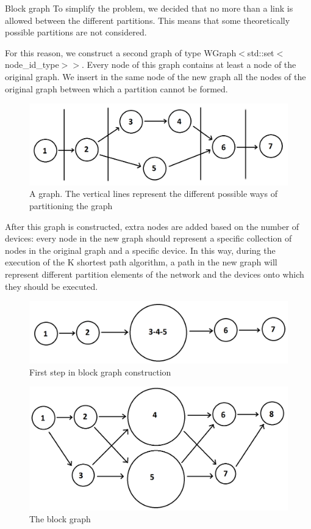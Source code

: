 \begin{frame}[allowframebreaks]{Block graph}
    To simplify the problem, we decided that no more than a link is allowed between the different partitions. This means that some theoretically possible partitions are not considered. 
    
    For this reason, we construct a second graph of type WGraph$<$std::set$<$node\_id\_type$>>$. Every node of this graph contains at least a node of the original graph. We insert in the same node of the new graph all the nodes of the original graph between which a partition cannot be formed.
    
        \begin{figure}[h]
        \centering
    \includegraphics[width=0.4\linewidth]{Img/butcher/basic_graph.png}
    \caption{A graph. The vertical lines represent the different possible ways of partitioning the graph}
    \end{figure}
    
    \framebreak
    
    After this graph is constructed, extra nodes are added based on the number of devices: every node in the new graph should represent a specific collection of nodes in the original graph and a specific device. In this way, during the execution of the K shortest path algorithm, a path in the new graph will represent different partition elements of the network and the devices onto which they should be executed.
    
    \framebreak
    
        \begin{figure}[h]
        \centering
    \includegraphics[width=0.4\linewidth]{Img/butcher/linearized_graph.png}
    \caption{First step in block graph construction}
    \end{figure}
    
    \begin{multicols}{2}
        \begin{figure}[h]
        \centering
    \includegraphics[width=0.75\linewidth]{Img/butcher/block_graph.png}
    \caption{The block graph}
    \end{figure}
    

\end{multicols}
\end{frame}
